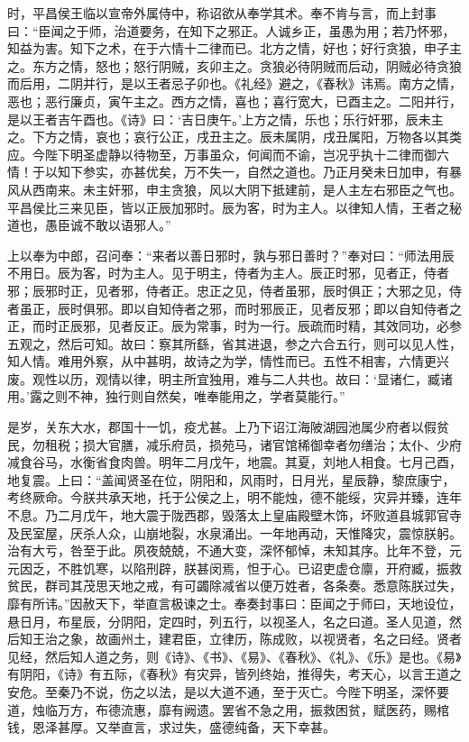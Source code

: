 \documentclass[12pt,UTF8]{ctexbook}
\begin{document}
时，平昌侯王临以宣帝外属侍中，称诏欲从奉学其术。奉不肯与言，而上封事曰：“臣闻之于师，治道要务，在知下之邪正。人诚乡正，虽愚为用；若乃怀邪，知益为害。知下之术，在于六情十二律而已。北方之情，好也；好行贪狼，申子主之。东方之情，怒也；怒行阴贼，亥卯主之。贪狼必待阴贼而后动，阴贼必待贪狼而后用，二阴并行，是以王者忌子卯也。《礼经》避之，《春秋》讳焉。南方之情，恶也；恶行廉贞，寅午主之。西方之情，喜也；喜行宽大，已酉主之。二阳并行，是以王者吉午酉也。《诗》曰：‘吉日庚午。’上方之情，乐也；乐行奸邪，辰未主之。下方之情，哀也；哀行公正，戌丑主之。辰未属阴，戌丑属阳，万物各以其类应。今陛下明圣虚静以待物至，万事虽众，何闻而不谕，岂况乎执十二律而御六情！于以知下参实，亦甚优矣，万不失一，自然之道也。乃正月癸未日加申，有暴风从西南来。未主奸邪，申主贪狼，风以大阴下抵建前，是人主左右邪臣之气也。平昌侯比三来见臣，皆以正辰加邪时。辰为客，时为主人。以律知人情，王者之秘道也，愚臣诚不敢以语邪人。”



上以奉为中郎，召问奉：“来者以善日邪时，孰与邪日善时？”奉对曰：“师法用辰不用日。辰为客，时为主人。见于明主，侍者为主人。辰正时邪，见者正，侍者邪；辰邪时正，见者邪，侍者正。忠正之见，侍者虽邪，辰时俱正；大邪之见，侍者虽正，辰时俱邪。即以自知侍者之邪，而时邪辰正，见者反邪；即以自知侍者之正，而时正辰邪，见者反正。辰为常事，时为一行。辰疏而时精，其效同功，必参五观之，然后可知。故曰：察其所繇，省其进退，参之六合五行，则可以见人性，知人情。难用外察，从中甚明，故诗之为学，情性而已。五性不相害，六情更兴废。观性以历，观情以律，明主所宜独用，难与二人共也。故曰：‘显诸仁，臧诸用。’露之则不神，独行则自然矣，唯奉能用之，学者莫能行。”



是岁，关东大水，郡国十一饥，疫尤甚。上乃下诏江海陂湖园池属少府者以假贫民，勿租税；损大官膳，减乐府员，损苑马，诸官馆稀御幸者勿缮治；太仆、少府减食谷马，水衡省食肉兽。明年二月戊午，地震。其夏，刘地人相食。七月己酉，地复震。上曰：“盖闻贤圣在位，阴阳和，风雨时，日月光，星辰静，黎庶康宁，考终厥命。今朕共承天地，托于公侯之上，明不能烛，德不能绥，灾异并臻，连年不息。乃二月戊午，地大震于陇西郡，毁落太上皇庙殿壁木饰，坏败道县城郭官寺及民室屋，厌杀人众，山崩地裂，水泉涌出。一年地再动，天惟降灾，震惊朕躬。治有大亏，咎至于此。夙夜兢兢，不通大变，深怀郁悼，未知其序。比年不登，元元因乏，不胜饥寒，以陷刑辟，朕甚闵焉，怛于心。已诏吏虚仓廪，开府臧，振救贫民，群司其茂思天地之戒，有可蠲除减省以便万姓者，各条奏。悉意陈朕过失，靡有所讳。”因赦天下，举直言极谏之士。奉奏封事曰：臣闻之于师曰，天地设位，悬日月，布星辰，分阴阳，定四时，列五行，以视圣人，名之曰道。圣人见道，然后知王治之象，故画州土，建君臣，立律历，陈成败，以视贤者，名之曰经。贤者见经，然后知人道之务，则《诗》、《书》、《易》、《春秋》、《礼》、《乐》是也。《易》有阴阳，《诗》有五际，《春秋》有灾异，皆列终始，推得失，考天心，以言王道之安危。至秦乃不说，伤之以法，是以大道不通，至于灭亡。今陛下明圣，深怀要道，烛临万方，布德流惠，靡有阙遗。罢省不急之用，振救困贫，赋医药，赐棺钱，恩泽甚厚。又举直言，求过失，盛德纯备，天下幸甚。
\end{document}
